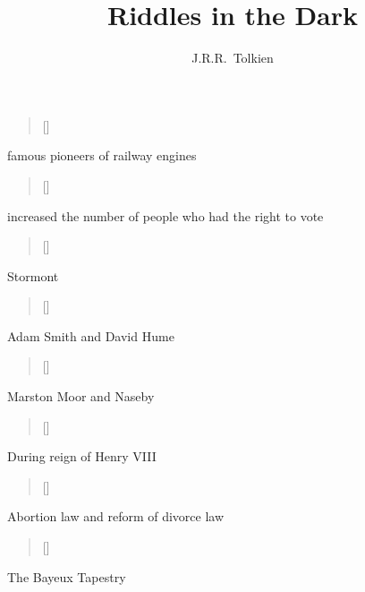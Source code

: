 \documentclass[grid,avery5371]{flashcards}
\title{Riddles in the Dark}
\author{J.R.R.~Tolkien}
\begin{document}
\begin{flashcard}[]{%
\begin{verse}[\versewidth]
\end{verse}}
famous pioneers of railway engines
\end{flashcard}

\begin{flashcard}[]{%
\begin{verse}[\versewidth]
\end{verse}}
increased the number of people who had the right to vote
\end{flashcard}

\begin{flashcard}[]{%
\begin{verse}[\versewidth]
\end{verse}}
Stormont
\end{flashcard}

\begin{flashcard}[]{%
\begin{verse}[\versewidth]
\end{verse}}
Adam Smith and David Hume
\end{flashcard}

\begin{flashcard}[]{%
\begin{verse}[\versewidth]
\end{verse}}
Marston Moor and Naseby
\end{flashcard}

\begin{flashcard}[]{%
\begin{verse}[\versewidth]
\end{verse}}
During reign of Henry VIII
\end{flashcard}

\begin{flashcard}[]{%
\begin{verse}[\versewidth]
\end{verse}}
Abortion law and reform of divorce law
\end{flashcard}

\begin{flashcard}[]{%
\begin{verse}[\versewidth]
\end{verse}}
The Bayeux Tapestry
\end{flashcard}
\end{document}
